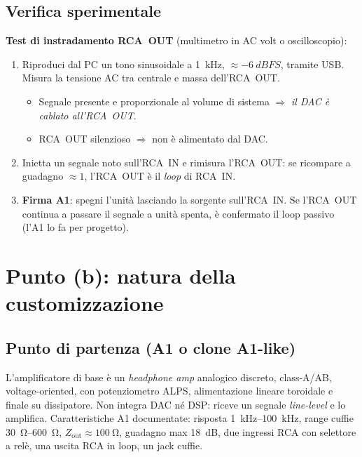 \subsection{Verifica sperimentale}\label{sec:misure}
\textbf{Test di instradamento RCA~OUT} (multimetro in AC volt o
oscilloscopio):
\begin{enumerate}
  \item Riproduci dal PC un tono sinusoidale a \SI{1}{kHz},
        $\approx\SI{-6}{dBFS}$, tramite USB. Misura la tensione AC tra
        centrale e massa dell'RCA~OUT.
        \begin{itemize}
          \item Segnale presente e proporzionale al volume di sistema
                $\Rightarrow$ \emph{il DAC è cablato all'RCA~OUT}.
          \item RCA~OUT silenzioso $\Rightarrow$ non è alimentato dal DAC.
        \end{itemize}
  \item Inietta un segnale noto sull'RCA~IN e rimisura l'RCA~OUT: se
        ricompare a guadagno $\approx1$, l'RCA~OUT è il \emph{loop} di RCA~IN.
  \item \textbf{Firma A1}: spegni l'unità lasciando la sorgente
        sull'RCA~IN. Se l'RCA~OUT continua a passare il segnale a unità
        spenta, è confermato il loop passivo (l'A1 lo fa per progetto).
\end{enumerate}

\section{Punto (b): natura della customizzazione}\label{sec:custom}

\subsection{Punto di partenza (A1 o clone A1-like)}
L'amplificatore di base è un \emph{headphone amp} analogico discreto,
class-A/AB, voltage-oriented, con potenziometro ALPS, alimentazione
lineare toroidale e finale su dissipatore. Non integra DAC né DSP:
riceve un segnale \emph{line-level} e lo amplifica. Caratteristiche A1
documentate: risposta \SIrange{1}{100}{kHz}, range cuffie
\SIrange{30}{600}{\ohm}, $Z_{\text{out}}\approx\SI{100}{\ohm}$, guadagno
max \SI{18}{dB}, due ingressi RCA con selettore a relè, una uscita RCA in
loop, un jack cuffie.

